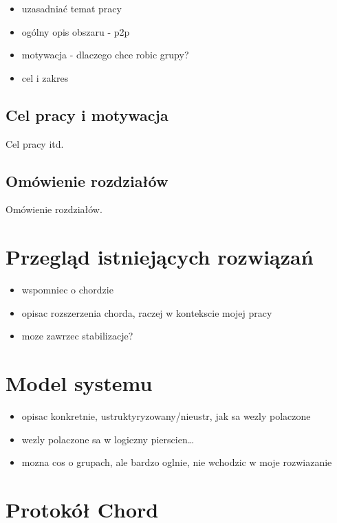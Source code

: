 \documentclass[12pt, twoside, openany]{report}
\begin{document}
\begin{itemize}
\item uzasadniać temat pracy
\item ogólny opis obszaru - p2p
\item motywacja - dlaczego chce robic grupy?
\item cel i zakres
\end{itemize}


\section{Cel pracy i motywacja}

Cel pracy itd.


\section{Omówienie rozdziałów}

Omówienie rozdziałów.



\chapter{Przegląd istniejących rozwiązań}

\begin{itemize}
\item wspomniec o chordzie
\item opisac rozszerzenia chorda, raczej w kontekscie mojej pracy
\item moze zawrzec stabilizacje?
\end{itemize}


\chapter{Model systemu}

\begin{itemize}
\item opisac konkretnie, ustruktyryzowany/nieustr, jak sa wezly polaczone
\item wezly polaczone sa w logiczny pierscien…
\item mozna cos o grupach, ale bardzo oglnie, nie wchodzic w moje rozwiazanie
\end{itemize}


\chapter{Protokół Chord}
\end{document}
